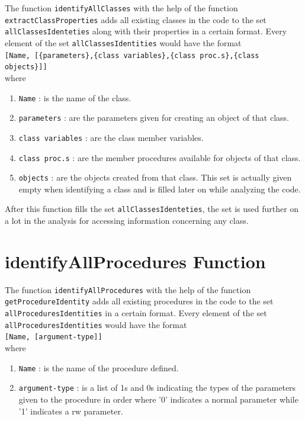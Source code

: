 \documentclass[11pt]{report}
\begin{document}
The function \texttt{identifyAllClasses} with the help of the function \texttt{extractClassProperties} adds all existing classes in the code to the set \texttt{allClassesIdenteties} along with their properties in a certain format. Every element of the set \texttt{allClassesIdentities} would have the format
\\[0.2cm]
\hspace*{0.6cm}
\texttt{[Name, [\{parameters\},\{class variables\},\{class proc.s\},\{class objects\}]]}
\\[0.2cm]
where
\begin{enumerate}
\item \texttt{Name} : is the name of the class.
\item \texttt{parameters} : are the parameters given for creating an object of that class.
\item \texttt{class variables} : are the class member variables.
\item \texttt{class proc.s} : are the member procedures available for objects of that class.
\item \texttt{objects} : are the objects created from that class. This set is actually given empty when identifying a class and is filled later on while analyzing the code.
\end{enumerate}

After this function fills the set \texttt{allClassesIdenteties}, the set is used further on a lot in the analysis for accessing information concerning any class.

\section{identifyAllProcedures Function}

The function \texttt{identifyAllProcedures} with the help of the function \texttt{getProcedureIdentity} adds all existing procedures in the code to the set \texttt{allProceduresIdentities} in a certain format. Every element of the set \texttt{allProceduresIdentities} would have the format
\\[0.2cm]
\hspace*{0.6cm}
\texttt{[Name, [argument-type]]}
\\[0.2cm]
where
\begin{enumerate}
\item \texttt{Name} : is the name of the procedure defined.
\item \texttt{argument-type} : is a list of 1s and 0s indicating the types of the parameters given to the procedure in order where '0' indicates a normal parameter while '1' indicates a rw parameter.
\end{enumerate}
\end{document}
